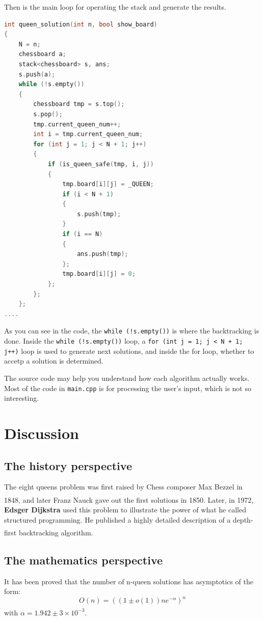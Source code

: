 \documentclass[cn,black,12pt,normal]{elegantnote}
\newcommand{\uct}[1]{\textsuperscript{\textsuperscript{\cite{#1}}}}
\begin{document}
Then is the main loop for operating the stack and generate the results.

\begin{lstlisting}[language = C++]
int queen_solution(int n, bool show_board)
{
	N = n;
	chessboard a;
	stack<chessboard> s, ans;
	s.push(a);
	while (!s.empty())
	{
		chessboard tmp = s.top();
		s.pop();
		tmp.current_queen_num++;
		int i = tmp.current_queen_num;
		for (int j = 1; j < N + 1; j++)
		{
			if (is_queen_safe(tmp, i, j))
			{
				tmp.board[i][j] = _QUEEN;
				if (i < N + 1)
				{
					s.push(tmp);
				}
				if (i == N)
				{
					ans.push(tmp);
				};
				tmp.board[i][j] = 0;
			};
		};
	};
....
\end{lstlisting}
As you can see in the code, the \lstinline{while (!s.empty())} is where the backtracking is done. Inside the \lstinline{while (!s.empty())} loop, a \lstinline{for (int j = 1; j < N + 1; j++)} loop is used to generate next solutions, and inside the for loop, whether to accetp a solution is determined.

The source code may help you understand how each algorithm actually works. Most of the code in \lstinline{main.cpp} is for processing the user's input, which is not so interesting.

\section{Discussion}

\subsection{The history perspective}
The eight queens problem was first raised by Chess composer Max Bezzel in 1848, and later Franz Nauck gave out the first solutions in 1850.\uct{rouse1960eight} Later, in 1972, \textbf{Edsger Dijkstra} used this problem to illustrate the power of what he called structured programming. He published a highly detailed description of a depth-first backtracking algorithm. \uct{wiki:Eight_queens_puzzle}

\subsection{The mathematics perspective}
It has been proved that the number of n-queen solutions has asymptotics of the form:
\begin{equation}
    O(n) = ((1\pm o(1))ne^{-\alpha})^n
\end{equation}
with $\alpha = 1.942 \pm 3 \times 10^{-3}$\uct{simkin2021number}.
\end{document}
